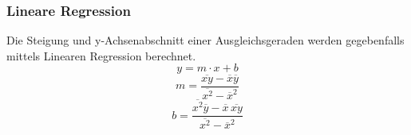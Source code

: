 \subsubsection{Lineare Regression}
Die Steigung und y-Achsenabschnitt einer Ausgleichsgeraden werden gegebenfalls mittels Linearen Regression berechnet.
\begin{equation}
	y = m \cdot x + b
	\label{eqn:reg}
\end{equation}
\begin{equation}
	m = \frac{ \overline{xy} - \overline{x} \overline{y} } {\overline{x^2} - \overline{x}^2}
	\label{eqn:reg_m}
\end{equation}
\begin{equation}
	b = \frac{ \overline{x^2}\overline{y} - \overline{x} \, \overline{xy}} { \overline{x^2} - \overline{x}^2}
	\label{eqn:reg_b}
\end{equation}
